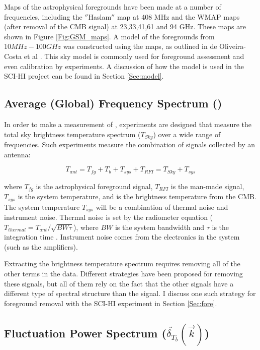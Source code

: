 Maps of the astrophysical foregrounds have been made at a number of frequencies, including the $''$Haslam$''$ map at 408 MHz and the WMAP maps (after removal of the CMB signal) at 23,33,41,61 and 94 GHz. These maps are shown in Figure \ref{Fig:GSM_maps}. A model of the foregrounds from $10 MHz-100 GHz$ was constructed using the maps, as outlined in de Oliveira-Costa et al \cite{GSM_model}. This sky model is commonly used for foreground assessment and even calibration by \cm experiments. A discussion of how the model is used in the SCI-HI project can be found in Section \ref{Sec:model}. 


\subsection{Average (Global) Frequency Spectrum (\avgdtb)}

In order to make a measurement of \avgdtb, experiments are designed that measure the total sky brightness temperature spectrum ($T_{Sky}$) over a wide range of frequencies. Such experiments measure the combination of signals collected by an antenna:

\begin{equation}
T_{ant} = T_{fg} + T_b +T_{sys}+T_{RFI} = T_{Sky} + T_{sys}
\end{equation}

where $T_{fg}$ is the astrophysical foreground signal, $T_{RFI}$ is the man-made signal, $T_{sys}$ is the system temperature, and \tb is the brightness temperature from the CMB. The system temperature $T_{sys}$ will be a combination of thermal noise and instrument noise. Thermal noise is set by the radiometer equation ($T_{thermal} = T_{ant}/\sqrt{BW \tau}$), where $BW$ is the system bandwidth and $\tau$ is the integration time \cite{carroll2007}. Instrument noise comes from the electronics in the system (such as the amplifiers). 

Extracting the \cm brightness temperature spectrum requires removing all of the other terms in the data. Different strategies have been proposed for removing these signals, but all of them rely on the fact that the other signals have a different type of spectral structure than the \cm signal. I discuss one such strategy for foreground removal with the SCI-HI experiment in Section \ref{Sec:fore}. 


\subsection{Fluctuation Power Spectrum ($ \tilde{ \delta_{T_b} } ( \vec{k} )$)}

